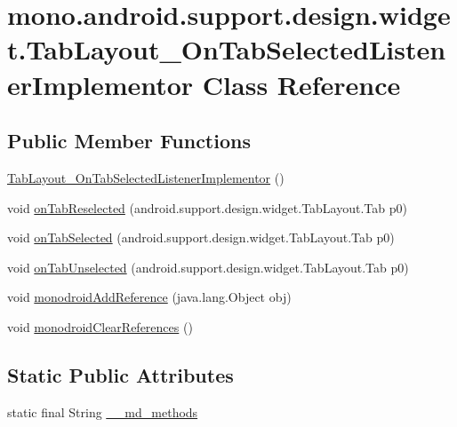 \hypertarget{classmono_1_1android_1_1support_1_1design_1_1widget_1_1_tab_layout___on_tab_selected_listener_implementor}{
\section{mono.android.support.design.widget.TabLayout\_\-OnTabSelectedListenerImplementor Class Reference}
\label{classmono_1_1android_1_1support_1_1design_1_1widget_1_1_tab_layout___on_tab_selected_listener_implementor}
}
\subsection*{Public Member Functions}
\begin{CompactItemize}
\item 
\hyperlink{classmono_1_1android_1_1support_1_1design_1_1widget_1_1_tab_layout___on_tab_selected_listener_implementor_293364ec2dcf978e729f333f117190d1}{TabLayout\_\-OnTabSelectedListenerImplementor} ()
\item 
void \hyperlink{classmono_1_1android_1_1support_1_1design_1_1widget_1_1_tab_layout___on_tab_selected_listener_implementor_7ec2a49269664d99cb90d0e2a341da9d}{onTabReselected} (android.support.design.widget.TabLayout.Tab p0)
\item 
void \hyperlink{classmono_1_1android_1_1support_1_1design_1_1widget_1_1_tab_layout___on_tab_selected_listener_implementor_e5e2165f79658a8e289dff880f9eeeec}{onTabSelected} (android.support.design.widget.TabLayout.Tab p0)
\item 
void \hyperlink{classmono_1_1android_1_1support_1_1design_1_1widget_1_1_tab_layout___on_tab_selected_listener_implementor_c7d1b1a44df7eb306b35a80be1ef03bd}{onTabUnselected} (android.support.design.widget.TabLayout.Tab p0)
\item 
void \hyperlink{classmono_1_1android_1_1support_1_1design_1_1widget_1_1_tab_layout___on_tab_selected_listener_implementor_c366225a0b919fe8a7df0dce363784e6}{monodroidAddReference} (java.lang.Object obj)
\item 
void \hyperlink{classmono_1_1android_1_1support_1_1design_1_1widget_1_1_tab_layout___on_tab_selected_listener_implementor_d3e27d3383e787abab61553c3ff8efba}{monodroidClearReferences} ()
\end{CompactItemize}
\subsection*{Static Public Attributes}
\begin{CompactItemize}
\item 
static final String \hyperlink{classmono_1_1android_1_1support_1_1design_1_1widget_1_1_tab_layout___on_tab_selected_listener_implementor_69fdb2fbe45dfaa066204c67c40d6229}{\_\-\_\-md\_\-methods}
\end{CompactItemize}
